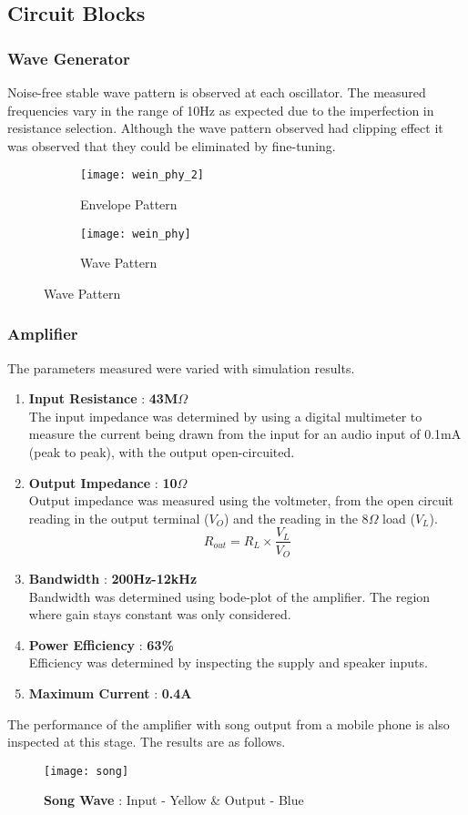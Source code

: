 \subsection{Circuit Blocks}
\subsubsection*{Wave Generator}
Noise-free stable wave pattern is observed at each oscillator. The measured frequencies vary in the range of 10Hz as expected due to the imperfection in resistance selection. Although the wave pattern observed had  clipping effect it was observed that they could be eliminated by fine-tuning.
\begin{figure}[h]
    \begin{subfigure}{.48\columnwidth}
        \texttt{[image: wein\_phy\_2]}
        \caption*{Envelope Pattern}
    \end{subfigure}
    \begin{subfigure}{.48\columnwidth}
        \texttt{[image: wein\_phy]}
        \caption*{Wave Pattern}
    \end{subfigure}
\end{figure}

\subsubsection*{Amplifier}
The parameters measured were varied with simulation results.
\begin{enumerate}
    \item \textbf{Input Resistance} : \textbf{43M$\Omega$}\\The input impedance was determined by using a digital multimeter to measure the current being drawn from the input for an audio input of 0.1mA (peak to peak), with the output open-circuited.
    \item \textbf{Output Impedance} : \textbf{10$\Omega$}\\Output impedance was measured using the voltmeter, from the open circuit reading in the output terminal ($V_O$) and the reading in the 8$\Omega$ load ($V_L$).
          $$R_{out}=R_L\times\frac{V_L}{V_O}$$
    \item \textbf{Bandwidth} : \textbf{200Hz-12kHz}\\Bandwidth was determined using bode-plot of the amplifier. The region where gain stays constant was only considered.
    \item \textbf{Power Efficiency} : \textbf{63\%}\\
          Efficiency was determined by inspecting the supply and speaker inputs.
    \item \textbf{Maximum Current} : \textbf{0.4A}
\end{enumerate}
The performance of the amplifier with song output from a mobile phone is also inspected at this stage. The results are as follows.
\begin{figure}[h]
    \centering
    \texttt{[image: song]}
    \caption*{\textbf{Song Wave} : Input - Yellow \& Output - Blue}
\end{figure}

